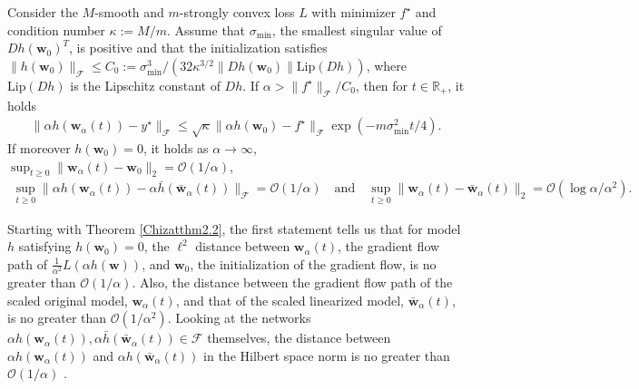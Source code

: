 \documentclass{article}
\newenvironment{manualtheorem}[1]{%
  \renewcommand\themanualtheoreminner{#1}%
  \manualtheoreminner
}{\endmanualtheoreminner}
\begin{document}
\begin{manualtheorem}{2.4}[from \cite{chizat2019lazy}]\label{Chizatthm2.4}
Consider the $M$-smooth and $m$-strongly convex loss $L$ with minimizer $f^{\star}$ and condition number $\kappa := M/m$. Assume that $\sigma_{\text{min}}$, the smallest singular value of $Dh(\boldsymbol{w}_0)^T$, is positive and that the initialization satisfies $\| h(\boldsymbol{w}_0) \|_{\mathcal{F}} \leq C_0:= \sigma_{\text{min}}^3/(32\kappa^{3/2} \| Dh(\boldsymbol{w}_0) \| \text{Lip}(Dh))$, where $\text{Lip}(Dh)$ is the Lipschitz constant of $Dh$. If $\alpha > \| f^{\star} \|_{\mathcal{F}} / C_0$, then for $t \in \mathbb{R}_+$, it holds
\begin{align*}
    \| \alpha h(\boldsymbol{w}_{\alpha}(t)) - y^{\star} \|_{\mathcal{F}} \leq \sqrt{\kappa} \| \alpha h(\boldsymbol{w}_0) - f^{\star} \|_{\mathcal{F}} \exp( -m \sigma_{\text{min}}^2 t/4).
\end{align*}
If moreover $h(\boldsymbol{w}_0) = 0$, it holds as $\alpha \rightarrow \infty$, $\sup_{t \geq 0} \| \boldsymbol{w}_{\alpha}(t) - \boldsymbol{w}_0 \|_2 = \mathcal{O}(1/\alpha)$,
\begin{align*}
    \sup_{t \geq 0} \| \alpha h(\boldsymbol{w}_{\alpha}(t)) - \alpha \bar{h}(\boldsymbol{\bar{w}}_{\alpha}(t)) \|_{\mathcal{F}} = \mathcal{O}(1/\alpha) \quad \text{and} \quad \sup_{t \geq 0} \| \boldsymbol{w}_{\alpha}(t) - \boldsymbol{\bar{w}}_{\alpha}(t) \|_2 = \mathcal{O}(\log \alpha/\alpha^2).
\end{align*}
\end{manualtheorem}

Starting with Theorem \ref{Chizatthm2.2}, the first statement tells us that for model $h$ satisfying $h(\boldsymbol{w}_0) = 0$, the $\ell^2$ distance between $\boldsymbol{w}_{\alpha}(t)$, the gradient flow path of $\frac{1}{\alpha^2} L(\alpha h(\boldsymbol{w}))$, and $\boldsymbol{w}_0$, the initialization of the gradient flow, is no greater than $\mathcal{O}(1/\alpha)$. Also, the distance between the gradient flow path of the scaled original model, $\boldsymbol{w}_{\alpha}(t)$, and that of the scaled linearized model, $\boldsymbol{\bar{w}}_{\alpha}(t)$, is no greater than $\mathcal{O}(1/\alpha^2)$. Looking at the networks $\alpha h(\boldsymbol{w}_{\alpha}(t)), \alpha \bar{h}(\boldsymbol{\bar{w}}_{\alpha}(t)) \in \mathcal{F}$ themselves, the distance between $\alpha h(\boldsymbol{w}_{\alpha}(t))$ and $\alpha h(\boldsymbol{\bar{w}}_{\alpha}(t))$ in the Hilbert space norm is no greater than $\mathcal{O}(1/\alpha)$ \cite{chizat2019lazy}. 
\end{document}
